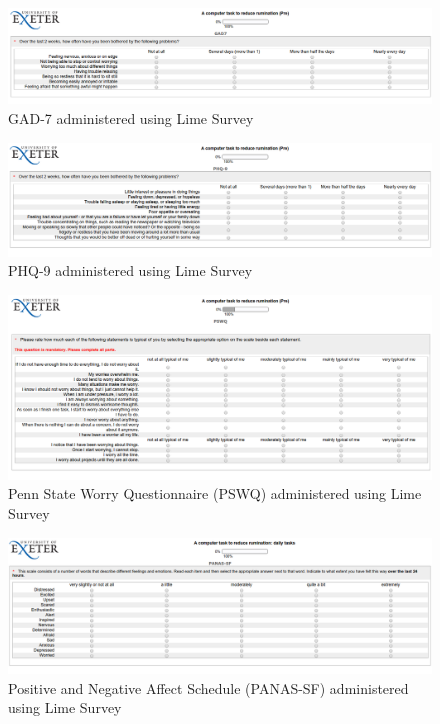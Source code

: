 \documentclass[man,floatsintext,a4paper,biblatex]{apa6}\usepackage[]{graphicx}\usepackage[]{color}
\begin{document}
\begin{figure}
\includegraphics[width=250mm]{figure/gad7.png}
\caption{GAD-7 administered using Lime Survey}
\end{figure}

\begin{figure}
\includegraphics[width=250mm]{figure/phq9.png}
\caption{PHQ-9 administered using Lime Survey}
\end{figure}

\begin{figure}
\includegraphics[width=250mm]{figure/pswq.png}
\caption{Penn State Worry Questionnaire (PSWQ) administered using Lime Survey}
\end{figure}

\begin{figure}
\includegraphics[width=250mm]{figure/panas.png}
\caption{Positive and Negative Affect Schedule (PANAS-SF) administered using Lime Survey}
\end{figure}
\end{document}
